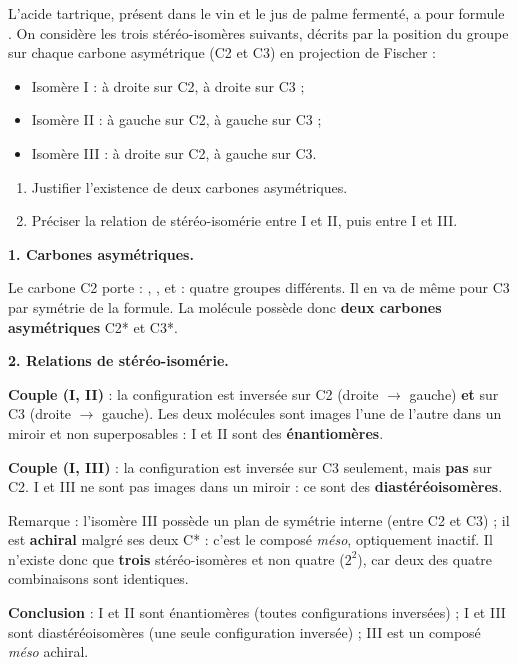 \documentclass[11pt]{article}
\begin{document}
\begin{exoresolu}
L'acide tartrique, présent dans le vin et le jus de palme fermenté, a pour formule . On considère les trois stéréo-isomères suivants, décrits par la position du groupe  sur chaque carbone asymétrique (C2 et C3) en projection de Fischer :
\begin{itemize}
\item Isomère I :  à droite sur C2,  à droite sur C3 ;
\item Isomère II :  à gauche sur C2,  à gauche sur C3 ;
\item Isomère III :  à droite sur C2,  à gauche sur C3.
\end{itemize}
\begin{enumerate}
\item Justifier l'existence de deux carbones asymétriques.
\item Préciser la relation de stéréo-isomérie entre I et II, puis entre I et III.
\end{enumerate}
\tcblower
\textbf{1. Carbones asymétriques.}

Le carbone C2 porte : , ,  et  : quatre groupes différents. Il en va de même pour C3 par symétrie de la formule. La molécule possède donc \textbf{deux carbones asymétriques} C2* et C3*.

\textbf{2. Relations de stéréo-isomérie.}

\textbf{Couple (I, II)} : la configuration est inversée sur C2 (droite $\to$ gauche) \textbf{et} sur C3 (droite $\to$ gauche). Les deux molécules sont images l'une de l'autre dans un miroir et non superposables : I et II sont des \textbf{énantiomères}.

\textbf{Couple (I, III)} : la configuration est inversée sur C3 seulement, mais \textbf{pas} sur C2. I et III ne sont pas images dans un miroir : ce sont des \textbf{diastéréoisomères}.

Remarque : l'isomère III possède un plan de symétrie interne (entre C2 et C3) ; il est \textbf{achiral} malgré ses deux C* : c'est le composé \emph{méso}, optiquement inactif. Il n'existe donc que \textbf{trois} stéréo-isomères et non quatre ($2^2$), car deux des quatre combinaisons sont identiques.

\textbf{Conclusion} : I et II sont énantiomères (toutes configurations inversées) ; I et III sont diastéréoisomères (une seule configuration inversée) ; III est un composé \emph{méso} achiral.
\end{exoresolu}
\end{document}
